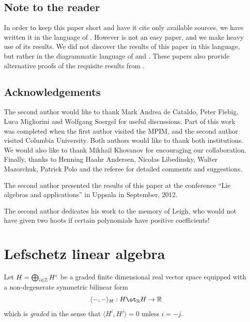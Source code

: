 \documentclass[11pt]{amsart}
\numberwithin{equation}{section}
\def\to{\rightarrow}
\theoremstyle{definition}
\theoremstyle{remark}
\begin{document}
\subsection{Note to the reader} In order to keep this paper short and
have it cite only available sources, we have written it in the
language of \cite{S3}. However \cite{S3} is not an easy
paper, and we make heavy use of its results. We did not discover the results of this paper in this language, but rather in the diagrammatic language of \cite{EW1} and \cite{EW2}.
These papers also provide alternative proofs of the requisite results from \cite{S3}.

\subsection{Acknowledgements} The second author would like to thank
Mark Andrea de Cataldo, Peter Fiebig, Luca Migliorini and Wolfgang Soergel for
useful discussions. Part of this work was 
completed when the first author visited the MPIM, and the second
author visited Columbia University. Both authors would like to
thank both institutions. We would also like to thank Mikhail Khovanov
for encouraging our collaboration. Finally, thanks to Henning Haahr
Andersen, Nicolas Libedinsky, Walter Mazorchuk, Patrick Polo and the
referee for detailed comments and suggestions.

The second author presented the results of this paper at the conference ``Lie algebras and applications'' in Uppsala in September, 2012.

The second author dedicates his work to the memory of
Leigh, who would not have given two hoots if certain
polynomials have positive coefficients!


\section{Lefschetz linear algebra}

\label{sec:lla}

  Let $H = \bigoplus_{i \in {\mathbb{Z}}} H^i$ be a graded finite dimensional
real vector space equipped with a non-degenerate symmetric 
bilinear form \[ \langle -, - \rangle_H : H \ot_{\RM} H \to \RM \] which is \emph{graded} in the sense that $\langle H^i, H^j \rangle = 0$ unless $i = -j$.
\end{document}
